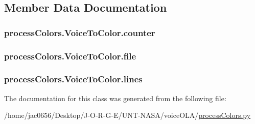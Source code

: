 \subsection{Member Data Documentation}
\subsubsection[{\texorpdfstring{counter}{counter}}]{\setlength{\rightskip}{0pt plus 5cm}process\+Colors.\+Voice\+To\+Color.\+counter}\hypertarget{classprocessColors_1_1VoiceToColor_abe1c0c0f2e7754f4e3d8995a16feea1a}{}\label{classprocessColors_1_1VoiceToColor_abe1c0c0f2e7754f4e3d8995a16feea1a}
\subsubsection[{\texorpdfstring{file}{file}}]{\setlength{\rightskip}{0pt plus 5cm}process\+Colors.\+Voice\+To\+Color.\+file}\hypertarget{classprocessColors_1_1VoiceToColor_a09fae3fac63c4ad02c417c20301efd2b}{}\label{classprocessColors_1_1VoiceToColor_a09fae3fac63c4ad02c417c20301efd2b}
\subsubsection[{\texorpdfstring{lines}{lines}}]{\setlength{\rightskip}{0pt plus 5cm}process\+Colors.\+Voice\+To\+Color.\+lines}\hypertarget{classprocessColors_1_1VoiceToColor_a80502bad87c17548da07d9d4e7960fff}{}\label{classprocessColors_1_1VoiceToColor_a80502bad87c17548da07d9d4e7960fff}


The documentation for this class was generated from the following file\+:\begin{DoxyCompactItemize}
\item 
/home/jac0656/\+Desktop/\+J-\/\+O-\/\+R-\/\+G-\/\+E/\+U\+N\+T-\/\+N\+A\+S\+A/voice\+O\+L\+A/\hyperlink{processColors_8py}{process\+Colors.\+py}\end{DoxyCompactItemize}
